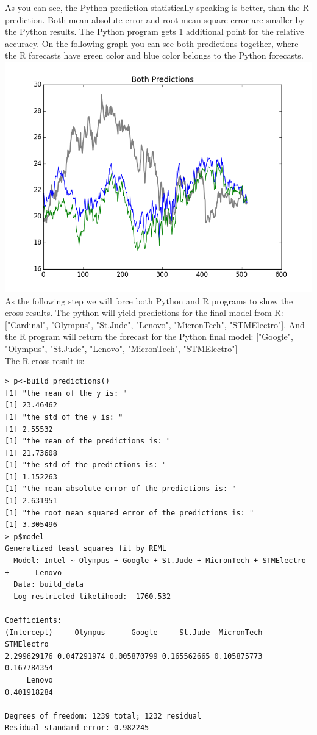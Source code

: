 \documentclass{article}
\begin{document}
As you can see, the Python prediction statistically speaking is better, than the R prediction. Both mean absolute error and root mean square error are smaller by the Python results. The Python program gets 1 additional point for the relative accuracy. On the following graph you can see both predictions together, where the R forecasts have green color and blue color belongs to the Python forecasts.\\
\includegraphics[scale=0.75]{BothPredictions.png}\\
As the following step we will force both Python and R programs to show the cross results. The python will yield predictions for the final model from R: ["Cardinal", "Olympus", "St.Jude", "Lenovo", "MicronTech", "STMElectro"]. And the R program will return the forecast for the Python final model: ["Google", "Olympus", "St.Jude", "Lenovo", "MicronTech", "STMElectro"]\\
The R cross-result is:
\begin{verbatim}
> p<-build_predictions()
[1] "the mean of the y is: "
[1] 23.46462
[1] "the std of the y is: "
[1] 2.55532
[1] "the mean of the predictions is: "
[1] 21.73608
[1] "the std of the predictions is: "
[1] 1.152263
[1] "the mean absolute error of the predictions is: "
[1] 2.631951
[1] "the root mean squared error of the predictions is: "
[1] 3.305496
> p$model
Generalized least squares fit by REML
  Model: Intel ~ Olympus + Google + St.Jude + MicronTech + STMElectro +      Lenovo 
  Data: build_data 
  Log-restricted-likelihood: -1760.532

Coefficients:
(Intercept)     Olympus      Google     St.Jude  MicronTech  STMElectro 
2.299629176 0.047291974 0.005870799 0.165562665 0.105875773 0.167784354 
     Lenovo 
0.401918284 

Degrees of freedom: 1239 total; 1232 residual
Residual standard error: 0.982245 
\end{verbatim}
\end{document}
